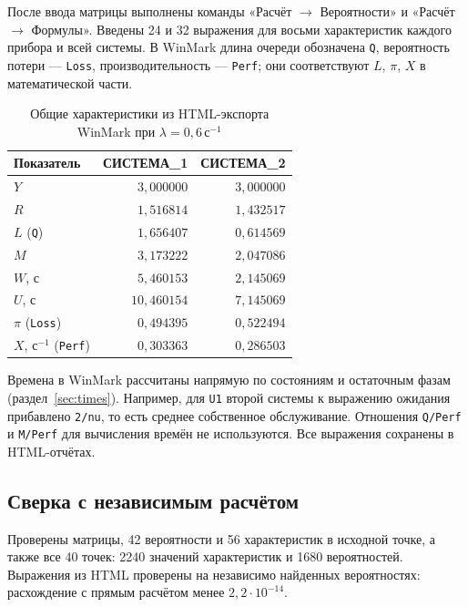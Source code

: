 \documentclass[a4paper,12pt]{article}
\newcommand{\sysone}{СИСТЕМА\_1}
\newcommand{\systwo}{СИСТЕМА\_2}
\newcommand{\secunit}{\,\text{с}^{-1}}
\begin{document}
После ввода матрицы выполнены команды «Расчёт $\to$ Вероятности» и «Расчёт $\to$ Формулы». Введены 24 и 32 выражения для восьми характеристик каждого прибора и всей системы. В WinMark длина очереди обозначена \texttt{Q}, вероятность потери --- \texttt{Loss}, производительность --- \texttt{Perf}; они соответствуют $L$, $\pi$, $X$ в математической части.

\begin{table}[H]\centering\small
\caption{Общие характеристики из HTML-экспорта WinMark при $\lambda=0{,}6\secunit$}\label{tab:markpoint}
\begin{tabular}{@{}lrr@{}}\toprule
Показатель & \sysone & \systwo\\\midrule
$Y$ & $3{,}000000$ & $3{,}000000$ \\
$R$ & $1{,}516814$ & $1{,}432517$ \\
$L$ (\texttt{Q}) & $1{,}656407$ & $0{,}614569$ \\
$M$ & $3{,}173222$ & $2{,}047086$ \\
$W$, с & $5{,}460153$ & $2{,}145069$ \\
$U$, с & $10{,}460154$ & $7{,}145069$ \\
$\pi$ (\texttt{Loss}) & $0{,}494395$ & $0{,}522494$ \\
$X$, $\text{с}^{-1}$ (\texttt{Perf}) & $0{,}303363$ & $0{,}286503$ \\
\bottomrule\end{tabular}
\end{table}

Времена в WinMark рассчитаны напрямую по состояниям и остаточным фазам (раздел~\ref{sec:times}). Например, для \texttt{U1} второй системы к выражению ожидания прибавлено \texttt{2/nu}, то есть среднее собственное обслуживание. Отношения \texttt{Q/Perf} и \texttt{M/Perf} для вычисления времён не используются. Все выражения сохранены в HTML-отчётах.

\subsection{Сверка с независимым расчётом}
Проверены матрицы, 42 вероятности и 56 характеристик в исходной точке, а также все 40 точек: 2240 значений характеристик и 1680 вероятностей. Выражения из HTML проверены на независимо найденных вероятностях: расхождение с прямым расчётом менее $2{,}2\cdot10^{-14}$.
\end{document}
